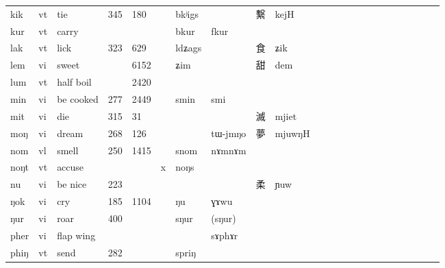 \documentclass[oldfontcommands,oneside,a4paper,11pt]{article}
\newcommand{\ipa}[1]{{\phon #1}} %
\newcommand{\zh}[1]{{\cn #1}}
\begin{document}
\begin{table}[H]
{\begin{tabular}{lllllllllllllllllllllll}
\ipa{kik}   &  	vt   &  	tie   &  	\tiny 345   &  	\tiny 180   &  	   &  	\ipa{bkʲigs}   &  	\ipa{}   &  	\zh{繫}   &  	\ipa{kejH}   \\  		
\ipa{kur}   &  	vt   &  	carry   &  	\tiny    &  	\tiny    &  	   &  	\ipa{bkur}   &  	\ipa{fkur}   &  	\zh{}   &  	\ipa{}   \\  		
\ipa{lak}   &  	vt   &  	lick   &  	\tiny 323   &  	\tiny 629   &  	   &  	\ipa{ldʑags}   &  	\ipa{}   &  	\zh{食}   &  	\ipa{ʑik}   \\  	
\ipa{lem}   &  	vi   &  	sweet   &  	\tiny    &  	\tiny   6152	   &    &  	\ipa{ʑim}   &  	\ipa{}   &  	\zh{甜}   &  	\ipa{dem}   \\  			
\ipa{lum}   &  	vt   &  	half boil   &  	\tiny    &  	\tiny 2420   &  	   &  	\ipa{}   &  	\ipa{}   &  	\zh{}   &  	\ipa{}   \\  		
\ipa{min}   &  	vi   &  	be cooked   &  	\tiny 277   &  	\tiny 2449   &  	   &  	\ipa{smin}   &  	\ipa{smi}   &  	\zh{}   &  	\ipa{}   \\  		
\ipa{mit}   &  	vi   &  	die   &  	\tiny 315   &  	\tiny 31   &  	   &  	\ipa{}   &  	\ipa{}   &  	\zh{滅}   &  	\ipa{mjiet}   \\  		
\ipa{moŋ}   &  	vi   &  	dream   &  	\tiny 268   &  	\tiny 126   &  	   &  	\ipa{}   &  	\ipa{tɯ-jmŋo}   &  	\zh{夢}   &  	\ipa{mjuwŋH}   \\  		
\ipa{nom}   &  	vl   &  	smell   &  	\tiny 250   &  	\tiny 1415   &  	   &  	\ipa{snom}   &  	\ipa{nɤmnɤm}   &  	\zh{}   &  	\ipa{}   \\  		
\ipa{noŋt}   &  	vt   &  	accuse   &  	\tiny    &  	\tiny    &  	x   &  	\ipa{noŋs }   &  	\ipa{}   &  	\zh{}   &  	\ipa{}   \\  		
\ipa{nu}   &  	vi   &  	be nice   &  	\tiny 223   &  	\tiny    &  	   &  	\ipa{}   &  	\ipa{}   &  	\zh{柔}   &  	\ipa{ɲuw}   \\  		
\ipa{ŋok}   &  	vi   &  	cry   &  	\tiny 185   &  	\tiny 1104   &  	   &  	\ipa{ŋu}   &  	\ipa{ɣɤwu}   &  	\zh{}   &  	\ipa{}   \\  		
\ipa{ŋur}   &  	vi   &  	roar   &  	\tiny 400   &  	\tiny    &  	   &  	\ipa{sŋur}   &  	\ipa{(sŋur)}   &  	\zh{}   &  	\ipa{}   \\  		
\ipa{pher}   &  	vi   &  	flap wing   &  	\tiny    &  	\tiny    &  	   &  	\ipa{}   &  	\ipa{sɤphɤr}   &  	\zh{}   &  	\ipa{}   \\  		
\ipa{phiŋ}   &  	vt   &  	send   &  	\tiny 282   &  	\tiny    &  	   &  	\ipa{spriŋ}   &  	\ipa{}   &  	\zh{}   &  	\ipa{}   \\  		

\end{tabular}}
\end{table}
\end{document}
